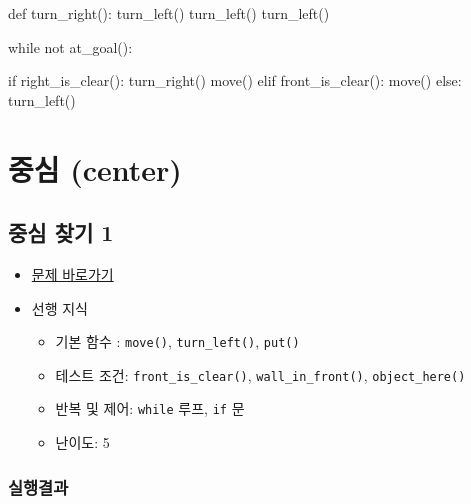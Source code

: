 \documentclass[
  b5paperpaper,
  DIV=11,
  numbers=noendperiod]{scrreprt}
\newenvironment{Shaded}{\begin{snugshade}}{\end{snugshade}}
\newcommand{\ControlFlowTok}[1]{\textcolor[rgb]{0.00,0.23,0.31}{#1}}
\newcommand{\KeywordTok}[1]{\textcolor[rgb]{0.00,0.23,0.31}{#1}}
\newcommand{\NormalTok}[1]{\textcolor[rgb]{0.00,0.23,0.31}{#1}}
\providecommand{\tightlist}{%
  \setlength{\itemsep}{0pt}\setlength{\parskip}{0pt}}\usepackage{longtable,booktabs,array}
\begin{document}
\begin{Shaded}
\begin{Highlighting}[]
\KeywordTok{def}\NormalTok{ turn\_right():}
\NormalTok{    turn\_left()}
\NormalTok{    turn\_left()}
\NormalTok{    turn\_left()}
    
\ControlFlowTok{while} \KeywordTok{not}\NormalTok{ at\_goal():}

    \ControlFlowTok{if}\NormalTok{ right\_is\_clear():}
\NormalTok{        turn\_right()}
\NormalTok{        move()}
    \ControlFlowTok{elif}\NormalTok{ front\_is\_clear():}
\NormalTok{        move()}
    \ControlFlowTok{else}\NormalTok{:}
\NormalTok{        turn\_left()    }
\end{Highlighting}
\end{Shaded}

\hypertarget{center}{%
\chapter{중심 (center)}\label{center}}

\hypertarget{center-01}{%
\section{중심 찾기 1}\label{center-01}}

\begin{itemize}
\tightlist
\item
  \href{https://reeborg.ca/reeborg.html?lang=ko-en\&mode=python\&menu=worlds\%2Fmenus\%2Freeborg_intro_en.json\&name=Center\%201\&url=worlds\%2Ftutorial_en\%2Fcenter1.json}{문제
  바로가기}
\item
  선행 지식

  \begin{itemize}
  \tightlist
  \item
    기본 함수 : \texttt{move()}, \texttt{turn\_left()}, \texttt{put()}
  \item
    테스트 조건: \texttt{front\_is\_clear()},
    \texttt{wall\_in\_front()}, \texttt{object\_here()}
  \item
    반복 및 제어: \texttt{while} 루프, \texttt{if} 문
  \item
    난이도: 5
  \end{itemize}
\end{itemize}

\hypertarget{uxc2e4uxd589uxacb0uxacfc-24}{%
\subsection{실행결과}\label{uxc2e4uxd589uxacb0uxacfc-24}}
\end{document}
